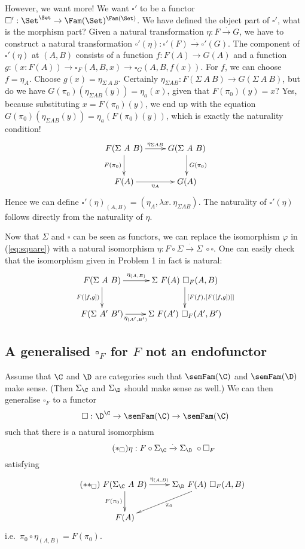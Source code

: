 \documentclass{article}
\begin{document}
However, we want more! We want $\square'$ to be a functor $\square' :
\Set^{\Set} \to \Fam(\Set)^{\Fam(\Set)}$. We have defined the object
part of $\square'$, what is the morphism part? Given a natural
transformation $\eta : F \xrightarrow{\cdot} G$, we have to construct
a natural transformation $\square'(\eta) : \square'(F)
\xrightarrow{\cdot} \square'(G)$. The component of $\square'(\eta)$ at
$(A, B)$ consists of a function $f : F(A) \to G(A)$ and a function $g
: (x : F(A)) \to \square_F(A, B, x) \to \square_G(A, B, f(x))$. For
$f$, we can choose $f = \eta_A$. Choose $g(x) = \eta_{\Sigma\ A\
  B}$. Certainly $\eta_{\Sigma A B} : F(\Sigma\ A\ B) \to G(\Sigma\ A\
B)$, but do we have $G(\pi_0)(\eta_{\Sigma A B}(y)) = \eta_a(x)$,
given that $F(\pi_0)(y) = x$? Yes, because substituting $x =
F(\pi_0)(y)$, we end up with the equation $G(\pi_0)(\eta_{\Sigma A
  B}(y)) = \eta_a(F(\pi_0)(y))$, which is exactly the naturality
condition!
\[
\xymatrix
{
F(\Sigma\ A\ B) \ar^-{\eta_{\Sigma A B}}[r] \ar_{F(\pi_0)}[d] & G(\Sigma\ A\ B) \ar^{G(\pi_0)}[d] \\
F(A) \ar_-{\eta_{A}}[r] & G(A) 
}
\]
Hence we can define $\square'(\eta)_{(A, B)} = (\eta_A,
\lambda x .\ \eta_{\Sigma A B})$. The naturality of $\square'(\eta)$
follows directly from the naturality of $\eta$.

Now that $\Sigma$ and $\square$ can be seen as functors, we can
replace the isomorphism $\varphi$ in (\ref{eq:square}) with a natural
isomorphism $\eta : F \circ \Sigma \xrightarrow{\cdot} \Sigma\ \circ
\square$. One can easily check that the isomorphism given in Problem 1
in fact is natural:
\[
\xymatrix
{
F(\Sigma\ A\ B) \ar^-{\eta_{(A, B)}}[r] \ar_{F([f, g])}[d] & \Sigma\ F(A)\ \square_F(A,B) \ar^{[F(f), [F([f,g])]]}[d] \\
F(\Sigma\ A'\ B')  \ar_-{\eta_{(A',B')}}[r] & \Sigma\ F(A')\ \square_F(A',B')
}
\]

\subsection{A generalised $\square_F$ for $F$ not an endofunctor}

Assume that $\C$ and $\D$ are categories such that
$\semFam({\C})$ and $\semFam({\D})$ make
sense. (Then $\Sigma_{\C}$ and $\Sigma_{\D}$ should
make sense as well.) We can then generalise $\square_F$ to a functor
\[
\square : \D^{\C} \to \semFam(\C) \to \semFam(\C)
\]
such that there is a natural isomorphism
\begin{equation}
  \label{eq:square}
  \tag{$\ast_{\square}$}
\eta : F \circ \Sigma_{\C} \xrightarrow{\cdot} \Sigma_{\D}\ \circ \square_F
\end{equation}
satisfying
\begin{equation}
  \label{eq:square2}
  \tag{$\ast\ast_{\square}$}
\xymatrix
{
F(\Sigma_{\C}\ A\ B) \ar^-{\eta_{(A, B)}}[r] \ar_{F(\pi_0)}[d] & \Sigma_{\D}\ F(A)\ \square_F(A, B) \ar^{\pi_0}[dl] \\
F(A)  & 
}
\end{equation}
i.e.\ $\pi_0 \circ \eta_{(A, B)} = F(\pi_0)$.
\end{document}
